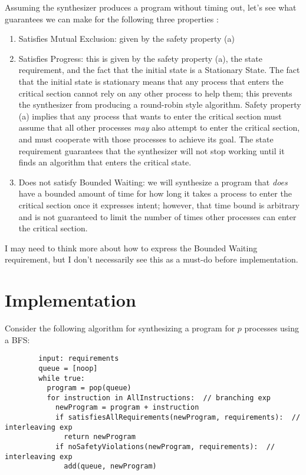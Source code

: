 \documentclass[12pt]{article}
\begin{document}
Assuming the synthesizer produces a program without timing out, let's see what guarantees we can make for the following three properties \cite{mutex}:
	\begin{enumerate}
		\item Satisfies Mutual Exclusion: given by the safety property (a)
		\item Satisfies Progress: this is given by the safety property (a),  the state requirement, and the fact that the initial state is a Stationary State.  The fact that the initial state is stationary means that any process that enters the critical section cannot rely on any other process to help them; this prevents the synthesizer from producing a round-robin style algorithm.  Safety property (a) implies that any process that wants to enter the critical section must assume that all other processes \textit{may} also attempt to enter the critical section, and must cooperate with those processes to achieve its goal.  The state requirement guarantees that the synthesizer will not stop working until it finds an algorithm that enters the critical state.  
		\item Does not satisfy Bounded Waiting: we will synthesize a program that \textit{does} have a bounded amount of time for how long it takes a process to enter the critical section once it expresses intent; however, that time bound is arbitrary and is not guaranteed to limit the number of times other processes can enter the critical section.  
	\end{enumerate}

I may need to think more about how to express the Bounded Waiting requirement, but I don't necessarily see this as a must-do before implementation.  


\section{Implementation}
Consider the following algorithm for synthesizing a program for $p$ processes using a BFS:
	\begin{verbatim}
		input: requirements
		queue = [noop]
		while true:
		  program = pop(queue)
		  for instruction in AllInstructions:  // branching exp
		    newProgram = program + instruction
		    if satisfiesAllRequirements(newProgram, requirements):  // interleaving exp
		      return newProgram
		    if noSafetyViolations(newProgram, requirements):  // interleaving exp
		      add(queue, newProgram)
	\end{verbatim}
\end{document}
